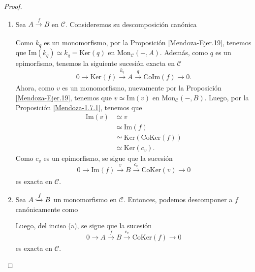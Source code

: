 \documentclass[tesis]{subfiles}
\begin{document}
\begin{proof}\leavevmode

    \begin{enumerate}[label=(\alph*)]
        \item Sea $A\xrightarrow[]{f} B$ en $\mathscr{C}$. Consideremos su descomposición canónica
            \begin{center}
            \end{center}
            Como $k_q$ es un monomorfismo, por la Proposición \ref{Mendoza-Ejer.19}, tenemos que $\text{Im}(k_q)\simeq k_q=\text{Ker}(q)$ en $\text{Mon}_\mathscr{C}(-,A)$. Además, como $q$ es un epimorfismo, tenemos la siguiente sucesión exacta en $\mathscr{C}$
            \[
            0\to \text{Ker}(f)\xrightarrow[]{k_q}A\xrightarrow[]{q}\text{CoIm}(f)\to 0.
            \] 
            Ahora, como $v$ es un monomorfismo, nuevamente por la Proposición \ref{Mendoza-Ejer.19}, tenemos que $v\simeq\text{Im}(v)$ en $\text{Mon}_\mathscr{C}(-,B)$. Luego, por la Proposición \ref{Mendoza-1.7.1}, tenemos que
            \begin{align*}
                \text{Im}(v) &\simeq v \\
                             &\simeq \text{Im}(f) \\
                             &\simeq \text{Ker}(\text{CoKer}(f)) \\
                             &\simeq \text{Ker}(c_v).
            \end{align*}
            Como $c_v$ es un epimorfismo, se sigue que la sucesión
            \[
            0\to \text{Im}(f)\xrightarrow[]{v}B\xrightarrow[]{c_v}\text{CoKer}(v)\to 0
            \] 
            es exacta en $\mathscr{C}$.

        \item Sea $A\xhookrightarrow{f} B$ un monomorfismo en $\mathscr{C}$. Entonces, podemos descomponer a $f$ canónicamente como
            \begin{center}
            \end{center}
            Luego, del inciso (a), se sigue que la sucesión
            \[
            0\to A\xrightarrow[]{f}B\xrightarrow[]{c_v}\text{CoKer}(f)\to 0
            \] 
            es exacta en $\mathscr{C}$.


\end{enumerate}
\end{proof}
\end{document}
